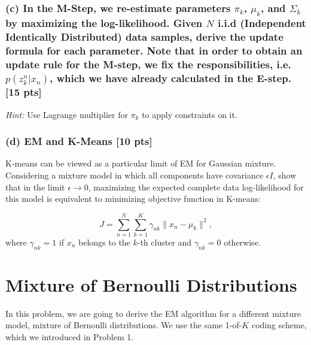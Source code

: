 \documentclass[twoside,10pt]{article}
\begin{document}
\subsubsection*{(c) In the M-Step, we re-estimate parameters $\pi_k$, $\mu_k$,
and $\Sigma_k$ by maximizing the log-likelihood. Given $N$ i.i.d (Independent
Identically Distributed) data samples, derive the update formula for
each parameter. Note that in order to obtain an update rule for the M-step, we fix the responsibilities, i.e. $p(z_k^n|x_n)$, which we have already calculated in the E-step. [15 pts]}

\emph{Hint:} Use Lagrange multiplier for $\pi_k$ to apply
constraints on it.

\subsubsection*{(d) EM and K-Means [10 pts]}
K-means can be viewed as a particular limit of EM for Gaussian
mixture. Considering a mixture model in which all components have
covariance $\epsilon I$, show that in the limit $\epsilon\to 0$,
maximizing the expected complete data log-likelihood for this model
is equivalent to minimizing objective function in K-means:

\begin{equation}
J = \sum_{n=1}^N\sum_{k=1}^K\gamma_{nk}\|x_n-\mu_k\|^2,\nonumber
\end{equation}
where $\gamma_{nk} = 1$ if $x_n$ belongs to the $k$-th cluster and $\gamma_{nk} = 0$ otherwise.

%

\vspace{1cm}


\iffalse
\section{Mixture of Bernoulli Distributions}
In this problem, we are going to derive the EM algorithm for a
different mixture model, mixture of Bernoulli distributions. We use
the same 1-of-$K$ coding scheme, which we introduced in Problem 1.
\end{document}
